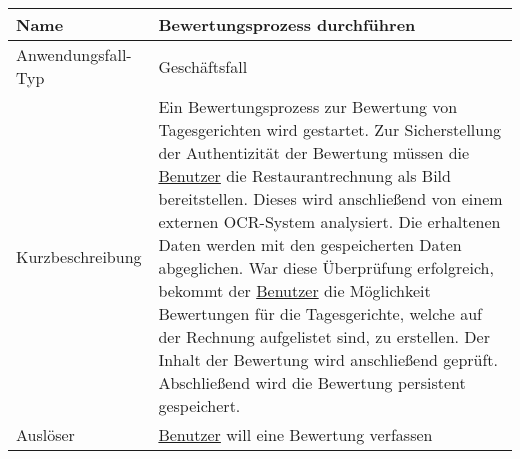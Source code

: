 \begin{table}[H]
    \centering
    \label{bewertungsprozessDurchfuehren}
    \begin{tabularx}{\textwidth}{| l | X |}
        \hline
        Name               & Bewertungsprozess durchführen                                                                                                                                                                                                                                                                                                                                                                                                                                                                                                                                                                                                                                     \\
        \hline
        Anwendungsfall-Typ & Geschäftsfall                                                                                                                                                                                                                                                                                                                                                                                                                                                                                                                                                                                                                                                     \\
        \hline
        Kurzbeschreibung   & Ein Bewertungsprozess zur Bewertung von Tagesgerichten wird gestartet. Zur Sicherstellung der Authentizität der Bewertung müssen die \hyperref[gls:nutzer]{Benutzer} die Restaurantrechnung als Bild bereitstellen. Dieses wird anschließend von einem externen OCR-System analysiert. Die erhaltenen Daten werden mit den gespeicherten Daten abgeglichen. War diese Überprüfung erfolgreich, bekommt der \hyperref[gls:nutzer]{Benutzer} die Möglichkeit Bewertungen für die Tagesgerichte, welche auf der Rechnung aufgelistet sind, zu erstellen. Der Inhalt der Bewertung wird anschließend geprüft. Abschließend wird die Bewertung persistent gespeichert. \\
        \hline
        Auslöser           & \hyperref[gls:nutzer]{Benutzer} will eine Bewertung verfassen                                                                                                                                                                                                                                                                                                                                                                                                                                                                                                                                                                                                     \\

\end{tabularx}
\end{table}
